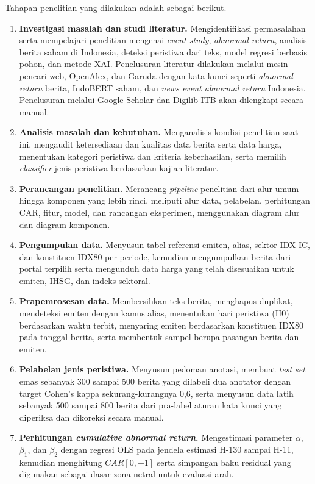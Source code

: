 Tahapan penelitian yang dilakukan adalah sebagai berikut.
\begin{enumerate}
    \item \textbf{Investigasi masalah dan studi literatur.} Mengidentifikasi permasalahan serta mempelajari penelitian mengenai \emph{event study}, \emph{abnormal return}, analisis berita saham di Indonesia, deteksi peristiwa dari teks, model regresi berbasis pohon, dan metode XAI. Penelusuran literatur dilakukan melalui mesin pencari web, OpenAlex, dan Garuda dengan kata kunci seperti \emph{abnormal return} berita, IndoBERT saham, dan \emph{news event abnormal return} Indonesia. Penelusuran melalui Google Scholar dan Digilib ITB akan dilengkapi secara manual.
    \item \textbf{Analisis masalah dan kebutuhan.} Menganalisis kondisi penelitian saat ini, mengaudit ketersediaan dan kualitas data berita serta data harga, menentukan kategori peristiwa dan kriteria keberhasilan, serta memilih \emph{classifier} jenis peristiwa berdasarkan kajian literatur.
    \item \textbf{Perancangan penelitian.} Merancang \emph{pipeline} penelitian dari alur umum hingga komponen yang lebih rinci, meliputi alur data, pelabelan, perhitungan CAR, fitur, model, dan rancangan eksperimen, menggunakan diagram alur dan diagram komponen.
    \item \textbf{Pengumpulan data.} Menyusun tabel referensi emiten, alias, sektor IDX-IC, dan konstituen IDX80 per periode, kemudian mengumpulkan berita dari portal terpilih serta mengunduh data harga yang telah disesuaikan untuk emiten, IHSG, dan indeks sektoral.
    \item \textbf{Prapemrosesan data.} Membersihkan teks berita, menghapus duplikat, mendeteksi emiten dengan kamus alias, menentukan hari peristiwa (H0) berdasarkan waktu terbit, menyaring emiten berdasarkan konstituen IDX80 pada tanggal berita, serta membentuk sampel berupa pasangan berita dan emiten.
    \item \textbf{Pelabelan jenis peristiwa.} Menyusun pedoman anotasi, membuat \emph{test set} emas sebanyak 300 sampai 500 berita yang dilabeli dua anotator dengan target Cohen's kappa sekurang-kurangnya 0,6, serta menyusun data latih sebanyak 500 sampai 800 berita dari pra-label aturan kata kunci yang diperiksa dan dikoreksi secara manual.
    \item \textbf{Perhitungan \emph{cumulative abnormal return}.} Mengestimasi parameter $\alpha$, $\beta_1$, dan $\beta_2$ dengan regresi OLS pada jendela estimasi H-130 sampai H-11, kemudian menghitung $CAR[0,+1]$ serta simpangan baku residual yang digunakan sebagai dasar zona netral untuk evaluasi arah.

\end{enumerate}
